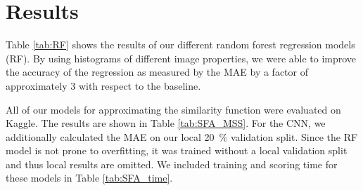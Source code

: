 \documentclass[10pt,conference,compsocconf]{IEEEtran}
\begin{document}

\section{Results}
\label{sec:results}

Table \ref{tab:RF} shows the results of our different random forest regression models (RF). By using histograms of different image properties, we were able to improve the accuracy of the regression as measured by the MAE by a factor of approximately 3 with respect to the baseline.

All of our models for approximating the similarity function were evaluated on Kaggle. The results are shown in Table \ref{tab:SFA_MSS}.
For the CNN, we additionally calculated the MAE on our local \SI{20}{\percent} validation split. Since the RF model is not prone to overfitting, it was trained without a local validation split and thus local results are omitted. We included training and scoring time for these models in Table \ref{tab:SFA_time}. 
\end{document}
